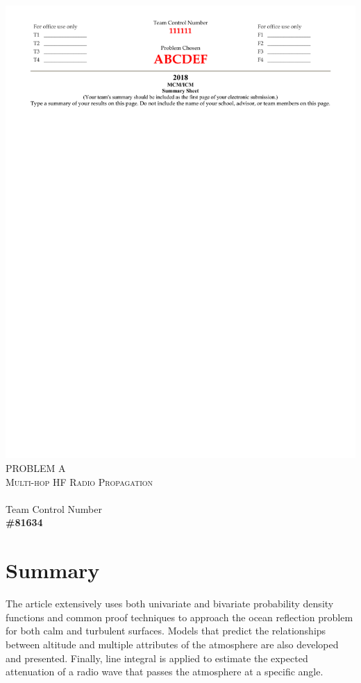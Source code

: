 \documentclass{article}
\title{}
\date{}
\begin{document}
\maketitle

\begin{center}
\includegraphics[width=\textwidth, trim=0 600 0 0]{2018Summary.pdf}
\textsc{PROBLEM A \\ Multi-hop HF Radio Propagation}\\[18pt]
\hline\\[8pt]
Team Control Number \\ \textbf{\#81634}
\end{center}

\section*{Summary}

The article extensively uses both univariate and bivariate probability density functions and common proof techniques to approach the ocean reflection problem for both calm and turbulent surfaces. Models that predict the relationships between altitude and multiple attributes of the atmosphere are also developed and presented. Finally, line integral is applied to estimate the expected attenuation of a radio wave that passes the atmosphere at a specific angle.
\end{document}

